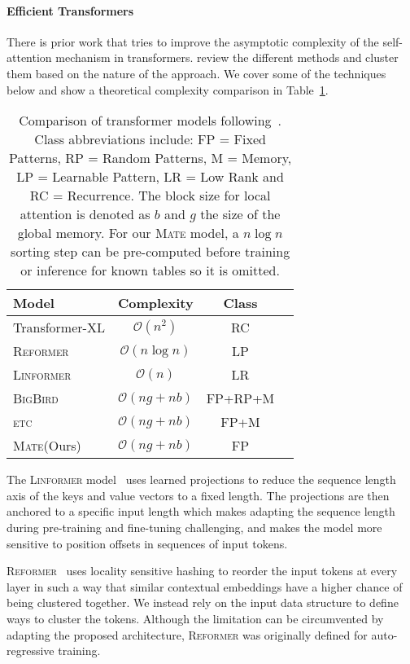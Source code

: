 \documentclass[11pt]{article}
\newcommand{\etc}{\textsc{etc}\xspace}
\newcommand{\bigbird}{\textsc{BigBird}\xspace}
\newcommand{\linformer}{\textsc{Linformer}\xspace}
\newcommand{\reformer}{\textsc{Reformer}\xspace}
\newcommand{\model}{\textsc{Mate}\xspace}
\begin{document}
\paragraph{Efficient Transformers}
There is prior work that tries to improve the asymptotic
complexity of the self-attention mechanism in transformers.
\citet{tay2020efficient} review the different methods and cluster them based
on the nature of the approach. We cover some of the techniques below and show a theoretical complexity comparison in Table~\ref{tab:complexity}.

\begin{table}[t]
    \centering
    \begin{tabular}{lccl}
    \hline
       Model  &  Complexity & Class\\
       \hline
         Transformer-XL
         & $\mathcal{O}(n^2)$ & RC \\ 
        \reformer 
        & $\mathcal{O}(n \log n)$ & LP\\
           \linformer 
           & $\mathcal{O}(n)$ & LR \\
        \bigbird 
        & $\mathcal{O}(ng + nb)$ & FP+RP+M\\ 
        \etc 
        & $\mathcal{O}(ng + nb)$ & FP+M\\ 
        \model (Ours) & $\mathcal{O}(ng + nb)$ & FP\\ 
        \hline
    \end{tabular}
    \caption{Comparison of transformer models following~\citet{tay2020efficient}. Class abbreviations include: FP = Fixed Patterns, RP = Random Patterns, M = Memory, LP = Learnable Pattern, LR = Low Rank and RC = Recurrence. The block size for local attention is denoted as $b$ and $g$ the size of the global memory. For our \model model, a $n \log n$ sorting step can be pre-computed before training or inference for known tables so it is omitted.}
    \label{tab:complexity}
\end{table} 
The \linformer model~\citet{wang2020linformer} uses learned projections to reduce the sequence length
axis of the keys and value vectors to a fixed length. The projections are then
anchored to a specific input length which makes adapting the sequence length
during pre-training and fine-tuning challenging, and makes the model more sensitive to position offsets in sequences of input tokens.

\reformer ~\citep{kitaev2020reformer} uses locality sensitive hashing to reorder the input
tokens at every layer in such a way that similar contextual embeddings have
a higher chance of being clustered together. We instead rely on the input data structure to define ways to cluster the tokens.
Although the limitation can be circumvented by adapting the proposed architecture, \reformer was originally defined for
auto-regressive training.
\end{document}
